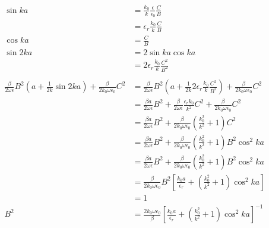 \documentclass[a4paper,10pt]{bxjsarticle}
\begin{document}
\begin{align*}
    \sin ka &= \frac{k_0}{k}\frac{\epsilon}{\epsilon_0} \frac{C}{B} \\
            &= \epsilon_r \frac{k_0}{k} \frac{C}{B} \\
    \cos ka &= \frac{C}{B} \\
    \sin 2ka &= 2 \sin ka \cos ka \\
             &= 2 \epsilon_r \frac{k_0}{k} \frac{C^2}{B^2}\\
    \\
    \frac{\beta}{2\omega \epsilon} B^2 \left( a + \frac{1}{2k} \sin 2ka \right) + \frac{\beta}{2k_0 \omega \epsilon_0} C^2
    &= \frac{\beta}{2\omega \epsilon} B^2 \left( a + \frac{1}{2k} 2 \epsilon_r \frac{k_0}{k} \frac{C^2}{B^2} \right) 
     + \frac{\beta}{2k_0 \omega \epsilon_0} C^2 \\
    &= \frac{\beta a}{2\omega \epsilon} B^2
     + \frac{\beta}{2\omega \epsilon} \frac{\epsilon_r k_0}{k^2} C^2
     + \frac{\beta}{2k_0 \omega \epsilon_0} C^2 \\
    &= \frac{\beta a}{2\omega \epsilon} B^2
     + \frac{\beta}{2k_0 \omega \epsilon_0} \left(
        \frac{k_0^2}{k^2} + 1
       \right) C^2 \\
    &= \frac{\beta a}{2\omega \epsilon} B^2
    + \frac{\beta}{2k_0 \omega \epsilon_0} \left(
        \frac{k_0^2}{k^2} + 1
        \right) B^2 \cos^2 ka \\
    &= \frac{\beta a}{2\omega \epsilon} B^2
    + \frac{\beta}{2k_0 \omega \epsilon_0} \left(
        \frac{k_0^2}{k^2} + 1
        \right) B^2 \cos^2 ka \\
    &= \frac{\beta}{2k_0 \omega \epsilon_0} B^2 \left[
        \frac{k_0 a}{\epsilon_r} + \left( \frac{k_0^2}{k^2} + 1 \right) \cos^2 ka
    \right] \\
    &= 1 \\
    B^2 &= \frac{2k_0 \omega \epsilon_0}{\beta} \left[
        \frac{k_0 a}{\epsilon_r} + \left( \frac{k_0^2}{k^2} + 1 \right) \cos^2 ka
    \right]^{-1} \\ 
\end{align*}





  
\end{document}
